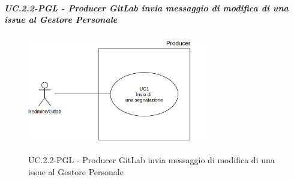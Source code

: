 		\subparagraph{UC\theuccount.2.2-PGL - Producer GitLab invia messaggio di modifica di una issue al Gestore Personale}
		\begin{figure}[H]
			\centering
			\includegraphics[width=0.7\textwidth]{img/UC1.png}\\
			\caption{UC\theuccount.2.2-PGL - Producer GitLab invia messaggio di modifica di una issue al Gestore Personale}
		\end{figure}
